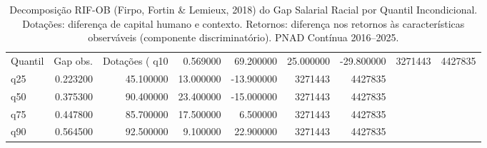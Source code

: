 \begin{table}
\caption{Decomposição RIF-OB (Firpo, Fortin \& Lemieux, 2018) do Gap Salarial Racial por Quantil Incondicional. Dotações: diferença de capital humano e contexto. Retornos: diferença nos retornos às características observáveis (componente discriminatório). PNAD Contínua 2016--2025.}
\label{tab:rif_ob}
\begin{tabular}{lrrrrrr}
\toprule
Quantil & Gap obs. & Dotações (%
\midrule
q10 & 0.569000 & 69.200000 & 25.000000 & -29.800000 & 3271443 & 4427835 \\
q25 & 0.223200 & 45.100000 & 13.000000 & -13.900000 & 3271443 & 4427835 \\
q50 & 0.375300 & 90.400000 & 23.400000 & -15.000000 & 3271443 & 4427835 \\
q75 & 0.447800 & 85.700000 & 17.500000 & 6.500000 & 3271443 & 4427835 \\
q90 & 0.564500 & 92.500000 & 9.100000 & 22.900000 & 3271443 & 4427835 \\
\bottomrule
\end{tabular}
\end{table}
